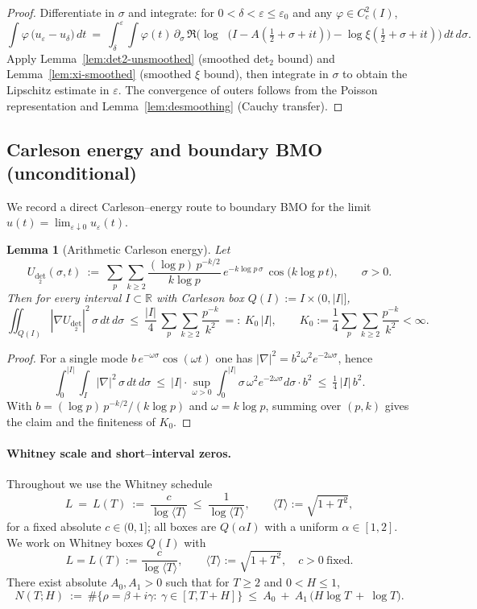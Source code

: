 \documentclass[11pt]{article}
\newtheorem{lemma}[theorem]{Lemma}
\theoremstyle{definition}
\theoremstyle{remark}
\newcommand{\R}{\mathbb{R}}
\DeclareMathOperator{\dettwo}{det_2}
\begin{document}
\begin{proof}
Differentiate in $\sigma$ and integrate: for $0<\delta<\varepsilon\le\varepsilon_0$ and any $\varphi\in C_c^2(I)$,
\[
 \int \!\varphi\,\big(u_\varepsilon-u_\delta\big)\,dt\ =\ \int_\delta^{\varepsilon}\!\int\! \varphi(t)\,\partial_\sigma\,\Re\Big(\log\dettwo\big(I\! -\!A(\tfrac12\!+\sigma\!+\!it)\big)-\log\xi(\tfrac12\!+\sigma\!+\!it)\Big)\,dt\,d\sigma.
\]
Apply Lemma~\ref{lem:det2-unsmoothed} (smoothed det$_2$ bound) and Lemma~\ref{lem:xi-smoothed} (smoothed $\xi$ bound), then integrate in $\sigma$ to obtain the Lipschitz estimate in $\varepsilon$. The convergence of outers follows from the Poisson representation and Lemma~\ref{lem:desmoothing} (Cauchy transfer).
\end{proof}

\subsection*{Carleson energy and boundary BMO (unconditional)}
We record a direct Carleson--energy route to boundary BMO for the limit $u(t)=\lim_{\varepsilon\downarrow 0}u_\varepsilon(t)$.

\begin{lemma}[Arithmetic Carleson energy]\label{lem:carleson-arith}
Let
\[
 U_{\det_2}(\sigma,t)\ :=\ \sum_{p}\sum_{k\ge 2}\frac{(\log p)\,p^{-k/2}}{k\log p}\,e^{-k\log p\,\sigma}\,\cos\big(k\log p\,t\big),\qquad \sigma>0.
\]
Then for every interval $I\subset\R$ with Carleson box $Q(I):=I\times(0,|I|]$,
\[
 \iint_{Q(I)} |\nabla U_{\det_2}|^2\,\sigma\,dt\,d\sigma\ \le\ \frac{|I|}{4}\,\sum_{p}\sum_{k\ge 2}\frac{p^{-k}}{k^2}
 \ =:\ K_0\,|I|,\qquad K_0:=\frac{1}{4}\sum_{p}\sum_{k\ge 2}\frac{p^{-k}}{k^2}<\infty.
\]
\end{lemma}
\begin{proof}
For a single mode $b\,e^{-\omega\sigma}\cos(\omega t)$ one has $|\nabla|^2=b^2\omega^2e^{-2\omega\sigma}$, hence
\[\int_0^{|I|}\!\int_I |\nabla|^2\,\sigma\,dt\,d\sigma\ \le\ |I|\cdot\sup_{\omega>0}\int_0^{|I|}\sigma\,\omega^2e^{-2\omega\sigma}d\sigma\cdot b^2\ \le\ \tfrac14\,|I|\,b^2.
\]
With $b=(\log p)\,p^{-k/2}/(k\log p)$ and $\omega=k\log p$, summing over $(p,k)$ gives the claim and the finiteness of $K_0$.
\end{proof}

\paragraph{Whitney scale and short–interval zeros.}
Throughout we use the Whitney schedule
\[
  L\ =\ L(T)\ :=\ \frac{c}{\log\langle T\rangle}\ \le\ \frac{1}{\log\langle T\rangle},\qquad \langle T\rangle:=\sqrt{1+T^2},
\]
for a fixed absolute $c\in(0,1]$; all boxes are $Q(\alpha I)$ with a uniform $\alpha\in[1,2]$.
We work on Whitney boxes $Q(I)$ with
\[
  L=L(T):=\frac{c}{\log\langle T\rangle},\qquad \langle T\rangle:=\sqrt{1+T^2},\quad c>0\ \text{fixed}.
\]
There exist absolute $A_0,A_1>0$ such that for $T\ge2$ and $0<H\le1$,
\[
  N(T;H)\ :=\ \#\{\rho=\beta+i\gamma:\ \gamma\in[T,T+H]\}\ \le\ A_0\ +\ A_1\,\big(H\log T\ +\ \log T\big).
\]
\end{document}
